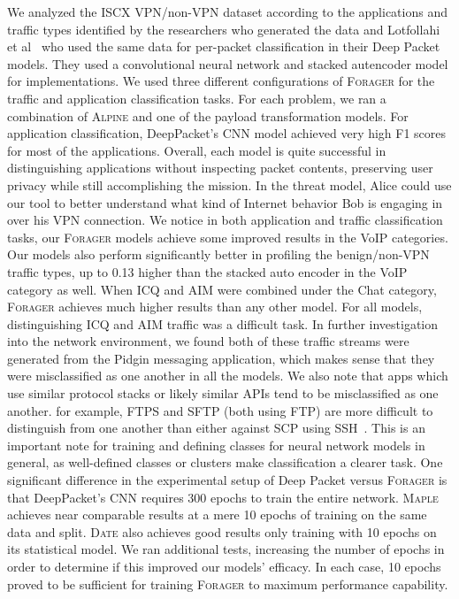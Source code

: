 We analyzed the ISCX VPN/non-VPN dataset according to the applications and traffic types identified by the researchers who generated the data and Lotfollahi et al~\cite{deeppacket} who used the same data for per-packet classification in their Deep Packet models. They used a convolutional neural network and stacked autencoder model for implementations. We used three different configurations of \textsc{Forager} for the traffic and application classification tasks. For each problem, we ran a combination of \textsc{Alpine} and one of the payload transformation models. For application classification, DeepPacket's CNN model achieved very high F1 scores for most of the applications. Overall, each model is quite successful in distinguishing applications without inspecting packet contents, preserving user privacy while still accomplishing the mission. In the threat model, Alice could use our tool to better understand what kind of Internet behavior Bob is engaging in over his VPN connection. We notice in both application and traffic classification tasks, our \textsc{Forager} models achieve some improved results in the VoIP categories. Our models also perform significantly better in profiling the benign/non-VPN traffic types, up to 0.13 higher than the stacked auto encoder in the VoIP category as well. When ICQ and AIM were combined under the Chat category, \textsc{Forager} achieves much higher results than any other model. For all models, distinguishing ICQ and AIM traffic was a difficult task. In further investigation into the network environment, we found both of these traffic streams were generated from the Pidgin messaging application, which makes sense that they were misclassified as one another in all the models. We also note that apps which use similar protocol stacks or likely similar APIs tend to be misclassified as one another. for example, FTPS and SFTP (both using FTP) are more difficult to distinguish from one another than either against SCP using SSH~\cite{deeppacket}. This is an important note for training and defining classes for neural network models in general, as well-defined classes or clusters make classification a clearer task. One significant difference in the experimental setup of Deep Packet versus \textsc{Forager} is that DeepPacket's CNN requires 300 epochs to train the entire network. \textsc{Maple} achieves near comparable results at a mere 10 epochs of training on the same data and split. \textsc{Date} also achieves good results only training with 10 epochs on its statistical model. We ran additional tests, increasing the number of epochs in order to determine if this improved our models' efficacy. In each case, 10 epochs proved to be sufficient for training \textsc{Forager} to maximum performance capability.

